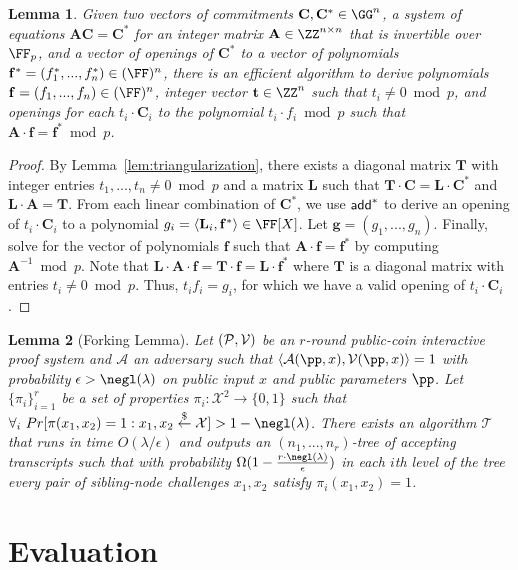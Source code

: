 \documentclass[12pt]{article}
\theoremstyle{Definition}
\newtheorem{lemma}{Lemma}
\begin{document}
\begin{lemma}\label{lem:extraction}
Given two vectors of commitments $\mathbf{C}, \mathbf{C^*} \in \G^n$, a system of equations $\mathbf{A} \mathbf{C} = \mathbf{C^*}$ for an integer matrix $\mathbf{A} \in \Z^{n \times n}$ that is invertible over $\F_p$, and a vector of openings of $\mathbf{C^*}$ to a vector of polynomials $\mathbf{f^*} = (f_1^*,...,f_n^*) \in (\FF)^n$, there is an efficient algorithm to derive polynomials $\mathbf{f} = (f_1,...,f_n) \in (\FF)^n$, integer vector $\mathbf{t} \in \Z^n$ such that $t_i \neq 0 \bmod p$, and openings for each $t_i \cdot \mathbf{C}_i$ to the polynomial $t_i \cdot f_i \bmod p$ such that $\mathbf{A} \cdot \mathbf{f} = \mathbf{f^*} \bmod p$. 
\end{lemma} 
\begin{proof} 
By Lemma~\ref{lem:triangularization}, there exists a diagonal matrix $\mathbf{T}$ with integer entries $t_1,...,t_n \neq 0 \bmod p$ and a matrix $\mathbf{L}$ such that $\mathbf{T} \cdot \mathbf{C} = \mathbf{L} \cdot \mathbf{C}^*$ and $\mathbf{L} \cdot \mathbf{A} = \mathbf{T}$. 
  From each linear combination of $\mathbf{C^*}$, we use $\textsf{add}^*$ to derive an opening of $t_i \cdot \mathbf{C}_i$ to a polynomial $g_i = \langle \mathbf{L}_i, \mathbf{f^*} \rangle \in \FX$.
   Let $\mathbf{g} = (g_1,...,g_n)$. Finally, solve for the vector of polynomials $\mathbf{f}$ such that $\mathbf{A} \cdot \mathbf{f} = \mathbf{f^*}$ by computing $\mathbf{A}^{-1} \bmod p$. Note that $\mathbf{L} \cdot \mathbf{A} \cdot \mathbf{f} = \mathbf{T} \cdot \mathbf{f} = \mathbf{L} \cdot \mathbf{f}^*$ where $\mathbf{T}$ is a diagonal matrix with entries $t_i \neq 0 \bmod p$. Thus, $t_i f_i = g_i$, for which we have a valid opening of $t_i \cdot \mathbf{C}_i$.   
\end{proof}

\begin{lemma}[Forking Lemma]\label{lem:forking}
Let $(\mathcal{P}, \mathcal{V})$ be an $r$-round public-coin interactive proof system and $\mathcal{A}$ an adversary such that $\langle \mathcal{A}(\pp, x), \verifier(\pp, x) \rangle = 1$ with probability $\epsilon > \negl(\lambda)$ on public input $x$ and public parameters $\pp$.  Let $\{\pi_i\}_{i =1}^r$ be a set of properties $\pi_i: \mathcal{X}^2 \rightarrow \{0,1\}$ such that $\forall_{i} \ Pr[ \pi(x_1, x_2) = 1: x_1, x_2 \sample \mathcal{X}] > 1 - \negl(\lambda)$. There exists an algorithm $\mathcal{T}$ that runs in time $O(\lambda/\epsilon)$ and outputs an $(n_1,...,n_r)$-tree of accepting transcripts such that with probability $\Omega(1 - \frac{r \cdot\negl(\lambda)}{\epsilon})$ in each $i$th level of the tree every pair of sibling-node challenges $x_1, x_2$ satisfy $\pi_i(x_1, x_2) = 1$. 
\end{lemma} 

\section{Evaluation}
 
 
\end{document}
